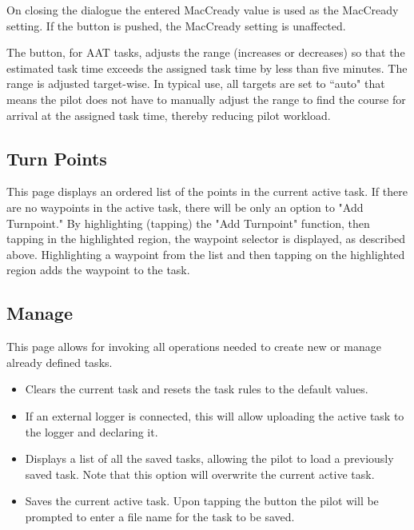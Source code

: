 On closing the dialogue the entered MacCready value is used as the MacCready
setting. If the  button is pushed, the MacCready setting is
unaffected.

The  button, for AAT tasks, adjusts the range
(increases or decreases) so that the estimated task time exceeds the
assigned task time by less than five minutes.  The range is adjusted
target-wise. In typical use, all targets are set to ``auto" that means the pilot
does not have to manually adjust the range to find the course for arrival at
the assigned task time, thereby reducing pilot workload.

\subsection*{Turn Points}
This page displays an ordered list of the points in the current active task.
If there are no waypoints in the active task, there
will be only an option to "Add Turnpoint."  By highlighting (tapping) the
"Add Turnpoint" function, then tapping in the highlighted region, the waypoint
selector is displayed, as described above.  Highlighting a waypoint from the
list and then tapping on the highlighted region adds the waypoint to the task.

\subsection*{Manage}
This page allows for invoking all operations needed to create new or manage
already defined tasks.


\begin{itemize}
\item [\bmenuw{New Task}] Clears the current task and resets the task rules to
  the default values.
\item [\bmenuw{Declare}] If an external logger is connected, this will allow
  uploading the  active task to the logger and declaring it.
\item [\bmenuw{Browse}] Displays a list of all the saved tasks, allowing the
  pilot to load a previously saved task.  Note that this option will overwrite
  the current active task.
\item [\bmenuw{Save}] Saves the current active task.  Upon tapping the
   button the pilot will be prompted to enter a file name for the
  task to be saved.
\end{itemize}

